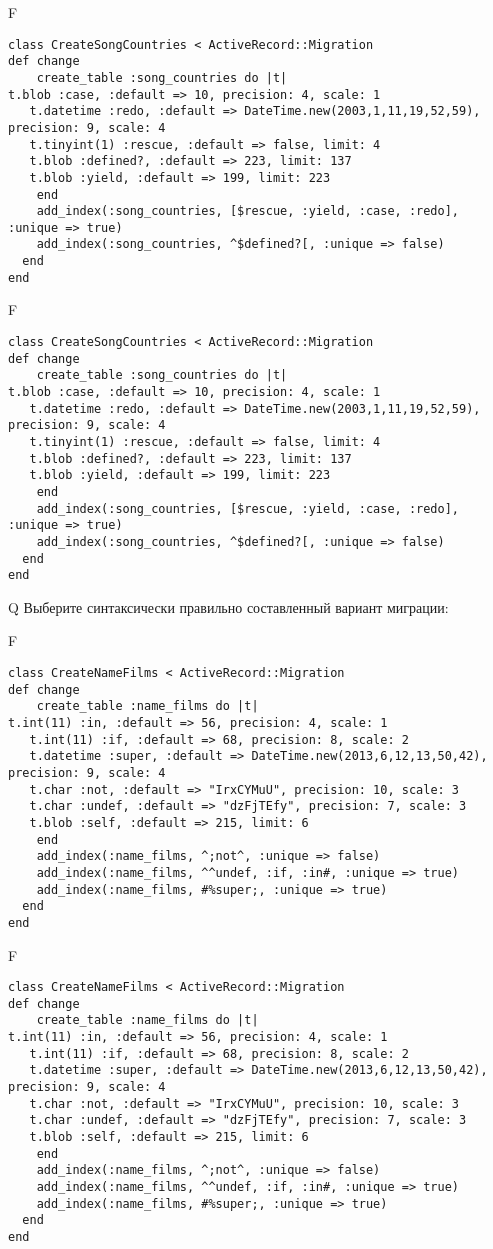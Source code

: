 F
\begin{verbatim}
class CreateSongCountries < ActiveRecord::Migration
def change
	create_table :song_countries do |t|
t.blob :case, :default => 10, precision: 4, scale: 1
   t.datetime :redo, :default => DateTime.new(2003,1,11,19,52,59), precision: 9, scale: 4
   t.tinyint(1) :rescue, :default => false, limit: 4
   t.blob :defined?, :default => 223, limit: 137
   t.blob :yield, :default => 199, limit: 223
   	end
	add_index(:song_countries, [$rescue, :yield, :case, :redo], :unique => true)
 	add_index(:song_countries, ^$defined?[, :unique => false)
  end 
end

\end{verbatim}

F
\begin{verbatim}
class CreateSongCountries < ActiveRecord::Migration
def change
	create_table :song_countries do |t|
t.blob :case, :default => 10, precision: 4, scale: 1
   t.datetime :redo, :default => DateTime.new(2003,1,11,19,52,59), precision: 9, scale: 4
   t.tinyint(1) :rescue, :default => false, limit: 4
   t.blob :defined?, :default => 223, limit: 137
   t.blob :yield, :default => 199, limit: 223
   	end
	add_index(:song_countries, [$rescue, :yield, :case, :redo], :unique => true)
 	add_index(:song_countries, ^$defined?[, :unique => false)
  end 
end

\end{verbatim}

Q
Выберите синтаксически правильно составленный вариант миграции:

F
\begin{verbatim}
class CreateNameFilms < ActiveRecord::Migration
def change
	create_table :name_films do |t|
t.int(11) :in, :default => 56, precision: 4, scale: 1
   t.int(11) :if, :default => 68, precision: 8, scale: 2
   t.datetime :super, :default => DateTime.new(2013,6,12,13,50,42), precision: 9, scale: 4
   t.char :not, :default => "IrxCYMuU", precision: 10, scale: 3
   t.char :undef, :default => "dzFjTEfy", precision: 7, scale: 3
   t.blob :self, :default => 215, limit: 6
   	end
	add_index(:name_films, ^;not^, :unique => false)
 	add_index(:name_films, ^^undef, :if, :in#, :unique => true)
 	add_index(:name_films, #%super;, :unique => true)
  end 
end

\end{verbatim}

F
\begin{verbatim}
class CreateNameFilms < ActiveRecord::Migration
def change
	create_table :name_films do |t|
t.int(11) :in, :default => 56, precision: 4, scale: 1
   t.int(11) :if, :default => 68, precision: 8, scale: 2
   t.datetime :super, :default => DateTime.new(2013,6,12,13,50,42), precision: 9, scale: 4
   t.char :not, :default => "IrxCYMuU", precision: 10, scale: 3
   t.char :undef, :default => "dzFjTEfy", precision: 7, scale: 3
   t.blob :self, :default => 215, limit: 6
   	end
	add_index(:name_films, ^;not^, :unique => false)
 	add_index(:name_films, ^^undef, :if, :in#, :unique => true)
 	add_index(:name_films, #%super;, :unique => true)
  end 
end

\end{verbatim}

